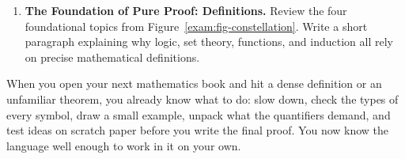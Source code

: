 \begin{enumerate}[resume]
  \item \textbf{The Foundation of Pure Proof: Definitions.}
  Review the four foundational topics from Figure~\ref{exam:fig-constellation}. Write a short paragraph explaining why logic, set theory, functions, and induction all rely on precise mathematical definitions.
\end{enumerate}

\begin{intuitionbox}
When you open your next mathematics book and hit a dense definition or an unfamiliar theorem, you already know what to do: slow down, check the types of every symbol, draw a small example, unpack what the quantifiers demand, and test ideas on scratch paper before you write the final proof. You now know the language well enough to work in it on your own.
\end{intuitionbox}

\newpage
